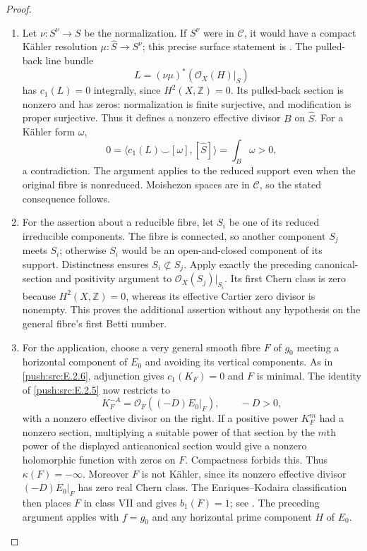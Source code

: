 \begin{proof}
\begin{enumerate}[label={$\langle1\rangle$\arabic*.},leftmargin=*]
\item Let $\nu:S^\nu\to S$ be the normalization.  If $S^\nu$ were
in $\mathcal C$, it would have a compact K\"ahler resolution
$\mu:\widehat S\to S^\nu$; this precise surface statement is
\citet[Lemma~3.3 and Corollary~3.4]{Fujino2021E}.
The pulled-back line bundle
\[
 L=(\nu\mu)^*(\mathcal O_X(H)|_S)
\]
has $c_1(L)=0$ integrally, since $H^2(X,\mathbb Z)=0$.
Its pulled-back section is nonzero and has zeros: normalization
is finite surjective, and modification is proper surjective.
Thus it defines a nonzero effective divisor $B$ on
$\widehat S$.  For a K\"ahler form $\omega$,
\[
 0=\langle c_1(L)\smile[\omega],[\widehat S]\rangle
   =\int_B\omega>0,
\]
a contradiction.  The argument applies to the reduced support
even when the original fibre is nonreduced.  Moishezon spaces
are in $\mathcal C$, so the stated consequence follows.

\item For the assertion about a reducible fibre, let $S_i$ be one
of its reduced irreducible components.  The fibre is connected,
so another component $S_j$ meets $S_i$; otherwise $S_i$ would
be an open-and-closed component of its support.  Distinctness
ensures $S_i\not\subset S_j$.  Apply exactly the preceding
canonical-section and positivity argument to
$\mathcal O_X(S_j)|_{S_i}$.  Its first Chern class is zero
because $H^2(X,\mathbb Z)=0$, whereas its effective Cartier
zero divisor is nonempty.  This proves the additional assertion
without any hypothesis on the general fibre's first Betti number.

\item For the application, choose a very general smooth fibre $F$
of $g_0$ meeting a horizontal component of $E_0$ and avoiding
its vertical components.  As in \ref{push:src:E.2.6}, adjunction gives
$c_1(K_F)=0$ and $F$ is minimal.  The identity of \ref{push:src:E.2.5} now
restricts to
\[
 K_F^{-A}=\mathcal O_F((-D)E_0|_F),
 \qquad -D>0,
\]
with a nonzero effective divisor on the right.  If a positive
power $K_F^m$ had a nonzero section, multiplying a suitable
power of that section by the $m$th power of the displayed
anticanonical section would give a nonzero holomorphic
function with zeros on $F$.  Compactness forbids this.
Thus $\kappa(F)=-\infty$.  Moreover $F$ is not K\"ahler,
since its nonzero effective divisor $(-D)E_0|_F$ has zero
real Chern class.  The Enriques--Kodaira classification then
places $F$ in class VII and gives $b_1(F)=1$; see
\citet[Chapter~VI, Theorem~1.1 and Table~10, pp.~243--244]
{BHPV2004E}.  The preceding argument applies with $f=g_0$
and any horizontal prime component $H$ of $E_0$.

\end{enumerate}
\end{proof}
